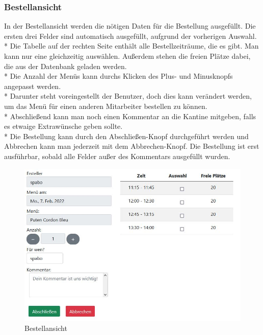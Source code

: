 \pagebreak

\subsubsection {Bestellansicht}

In der Bestellansicht werden die nötigen Daten für die Bestellung ausgefüllt. Die ersten drei Felder sind automatisch ausgefüllt, aufgrund der vorherigen Auswahl. \\*
Die Tabelle auf der rechten Seite enthält alle Bestellzeiträume, die es gibt. Man kann nur eine gleichzeitig auswählen. Außerdem stehen die freien Plätze dabei, die aus der Datenbank geladen werden.\\*
Die Anzahl der Menüs kann durchs Klicken des Plus- und Minusknopfs angepasst werden.  \\*
Darunter steht voreingestellt der Benutzer, doch dies kann verändert werden, um das Menü für einen anderen Mitarbeiter bestellen zu können. \\*
Abschließend kann man noch einen Kommentar an die Kantine mitgeben, falls es etwaige Extrawünsche geben sollte. \\*
Die Bestellung kann durch den Abschließen-Knopf durchgeführt werden und Abbrechen kann man jederzeit mit dem Abbrechen-Knopf.
Die Bestellung ist erst ausführbar, sobald alle Felder außer des Kommentars ausgefüllt wurden.
\begin{figure}[htp]
    \centering
    \includegraphics[scale=0.6]{pics/mitarbeiter-bestellen.JPG}
    \caption{Bestellansicht}
    \label{fig:impl:BestellenMitarbeiter}
\end{figure}
\pagebreak

